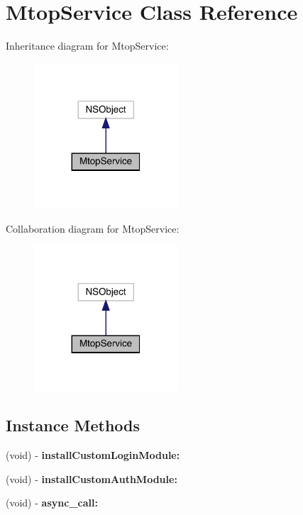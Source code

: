 \hypertarget{interface_mtop_service}{}\section{Mtop\+Service Class Reference}
\label{interface_mtop_service}


Inheritance diagram for Mtop\+Service\+:\nopagebreak
\begin{figure}[H]
\begin{center}
\leavevmode
\includegraphics[width=152pt]{interface_mtop_service__inherit__graph}
\end{center}
\end{figure}


Collaboration diagram for Mtop\+Service\+:\nopagebreak
\begin{figure}[H]
\begin{center}
\leavevmode
\includegraphics[width=152pt]{interface_mtop_service__coll__graph}
\end{center}
\end{figure}
\subsection*{Instance Methods}
\begin{DoxyCompactItemize}
\item 
\mbox{\label{interface_mtop_service_a87ec70011f68b3a02cf2fdb5105b446d}} 
(void) -\/ {\bfseries install\+Custom\+Login\+Module\+:}
\item 
\mbox{\label{interface_mtop_service_afc18deb1ea9308e6280a0ae317a3f9b9}} 
(void) -\/ {\bfseries install\+Custom\+Auth\+Module\+:}
\item 
\mbox{\label{interface_mtop_service_ad4a2fa24bf8967a1d40f39cb1a8baa57}} 
(void) -\/ {\bfseries async\+\_\+call\+:}
\end{DoxyCompactItemize}
